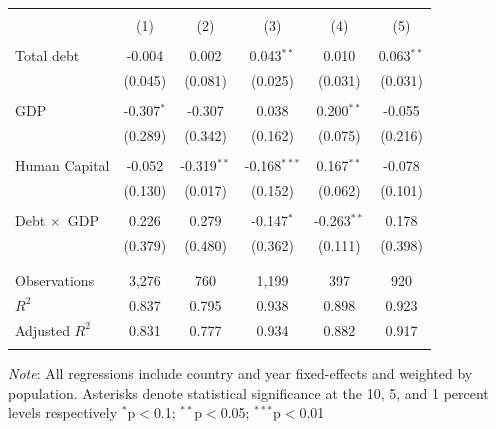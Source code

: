 \documentclass[12pt, titlepage]{article}
\numberwithin{equation}{section}
\begin{document}
\centering
\begin{threeparttable}[!htbp] \centering \footnotesize
	\caption{} 
	\label{} 
	\begin{tabular}{@{\extracolsep{5pt}}lccccc} 
		\\[-1.8ex]\toprule

		\\[-1.8ex] & (1) & (2) & (3) & (4) & (5) \\
		\hline \\[-1.8ex] 
		Total debt & -0.004 & 0.002 & 0.043$^{**}$ & 0.010 & 0.063$^{**}$  \\ 
		& (0.045) & (0.081) & (0.025) & (0.031) & (0.031) \\ 
		& & & & & \\ 
		GDP & -0.307$^{*}$ & -0.307 & 0.038 & 0.200$^{**}$ & -0.055  \\ 
		& (0.289) & (0.342) & (0.162) & (0.075) & (0.216) \\ 
		& & & & & \\ 
		Human Capital & -0.052 & -0.319$^{**}$ & -0.168$^{***}$ & 0.167$^{**}$ &-0.078 \\ 
		& (0.130) & (0.017) & (0.152) & (0.062) & (0.101)\\ 
		& & & & & \\ 
		Debt $\times$\, GDP & 0.226 & 0.279 & -0.147$^{*}$ & -0.263$^{**}$ & 0.178 \\ 
		& (0.379) & (0.480) & (0.362) & (0.111) & (0.398) \\ 
		& & & & &  \\ 
		\hline \\[-1.8ex] 
		Observations & 3,276 & 760 & 1,199 & 397 & 920 \\ 
		$R^{2}$ & 0.837 & 0.795 & 0.938 & 0.898 & 0.923  \\ 
		Adjusted $R^{2}$ & 0.831 & 0.777 & 0.934 & 0.882 & 0.917 \\ 
		\midrule \\
	\end{tabular} 
	\noindent
	\begin{tablenotes} 
		\item \textit{Note}: All regressions include country and year fixed-effects and weighted by population. Asterisks denote statistical significance at the 10, 5, and 1 percent levels respectively {$^{*}$p$<$0.1; $^{**}$p$<$0.05; $^{***}$p$<$0.01} 
		\end{tablenotes}
\end{threeparttable} 
\end{document}
